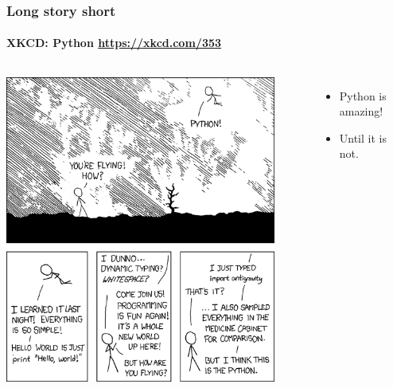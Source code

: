 \begin{frame}
	\frametitle{Long story short}
	\framesubtitle{XKCD: Python \url{https://xkcd.com/353}}
	\begin{columns}
	\begin{center}
		\includegraphics[width=0.9\textwidth]{figures/python.png}\\
	\end{center}
		\begin{itemize}
			\item Python is amazing!
				\pause
			\item Until it is not.
		\end{itemize}
	\end{columns}
\end{frame}


